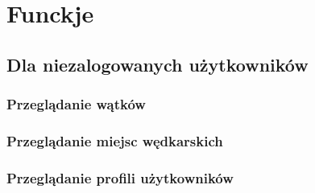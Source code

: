 \documentclass{article}
\begin{document}
\section{Funckje}

\subsection{Dla niezalogowanych użytkowników}
\subsubsection{Przeglądanie wątków}
\subsubsection{Przeglądanie miejsc wędkarskich}
\subsubsection{Przeglądanie profili użytkowników}
\end{document}
